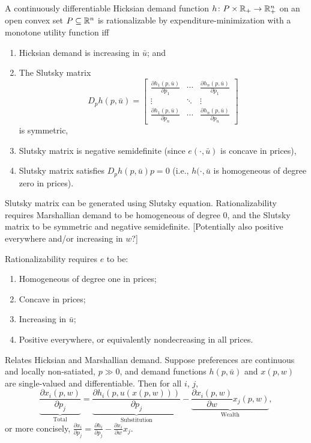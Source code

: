 \documentclass[8pt,letterpaper, landscape]{extarticle} %
\begin{document}
\begin{multicols}{3}
\begin{description}
 A continuously differentiable Hicksian demand function $ h \colon P \times \mathbb{R}_{+} \to \mathbb{R}^{n}_{+} $ on an open convex set $ P \subseteq \mathbb{R}^n $ is rationalizable by expenditure-minimization with a monotone utility function iff
\begin{enumerate}
\item Hicksian demand is increasing in $ \bar{u} $; and
\item The Slutsky matrix
$$ D_p h(p, \bar{u}) = \begin{bmatrix}
\tfrac{\partial h_1 (p, \bar{u})}{\partial p_1} & \cdots & \tfrac{\partial h_n (p, \bar{u})}{\partial p_1} \\ 
\vdots & \ddots & \vdots \\
\tfrac{\partial h_1 (p, \bar{u})}{\partial p_n} & \cdots & \tfrac{\partial h_n (p, \bar{u})}{\partial p_n}
\end{bmatrix} $$
is symmetric,
\item Slutsky matrix is negative semidefinite (since $ e (\cdot, \bar{u}) $ is concave in prices),
\item Slutsky matrix satisfies $ D_p h(p, \bar{u}) p = 0 $ (i.e., $ h (\cdot, \bar{u} $ is homogeneous of degree zero in prices).
\end{enumerate}

 Slutsky matrix can be generated using Slutsky equation. Rationalizability requires Marshallian demand to be homogeneous of degree 0, and the Slutsky matrix to be symmetric and negative semidefinite. [Potentially also positive everywhere and/or increasing in $ w $?]

 Rationalizability requires $ e $ to be:
\begin{enumerate}
\item Homogeneous of degree one in prices;
\item Concave in prices;
\item Increasing in $ \bar{u} $;
\item Positive everywhere, or equivalently nondecreasing in all prices.
\end{enumerate}

 Relates Hicksian and Marshallian demand. Suppose preferences are continuous and locally non-satiated, $ p \gg 0 $, and demand functions $ h(p, \bar{u}) $ and $ x(p, w) $ are single-valued and differentiable. Then for all $ i $, $ j $,
$$ \underbrace{\frac{\partial x_i (p,w)}{\partial p_j}}_{\text{Total}} = \underbrace{\frac{\partial h_i (p, u(x(p,w)))}{\partial p_j}}_{\text{Substitution}} - \underbrace{\frac{\partial x_i (p, w)}{\partial w} x_j(p, w)}_{\text{Wealth}}, $$
or more concisely, $ \frac{\partial x_i}{\partial p_j} = \frac{\partial h_i}{\partial p_j} - \frac{\partial x_i}{\partial w} x_j $.


\end{description}
\end{multicols}
\end{document}
